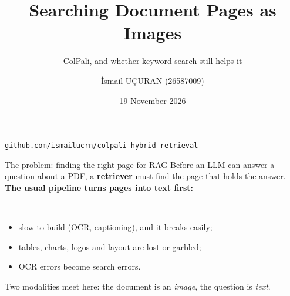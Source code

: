 \documentclass[aspectratio=169,11pt]{beamer}
\title{Searching Document Pages as Images}
\subtitle{ColPali, and whether keyword search still helps it}
\author{\.{I}smail U\c{C}URAN \quad (26587009)}
\institute{YZM5110 Multimodal Learning - Research Project}
\date{19 November 2026}
\begin{document}
\begin{frame}
\titlepage
\centering\footnotesize\texttt{github.com/ismailucrn/colpali-hybrid-retrieval}
\end{frame}

\begin{frame}{The problem: finding the right page for RAG}
Before an LLM can answer a question about a PDF, a \textbf{retriever} must find the page that holds the answer.\\[10pt]
\textbf{The usual pipeline turns pages into text first:}\\[6pt]
\\[10pt]
\begin{itemize}
  \item slow to build (OCR, captioning), and it breaks easily;
  \item tables, charts, logos and layout are lost or garbled;
  \item OCR errors become search errors.
\end{itemize}
\vspace{4pt}
\textcolor{muted}{Two modalities meet here: the document is an \emph{image}, the question is \emph{text}.}
\end{frame}
\end{document}
